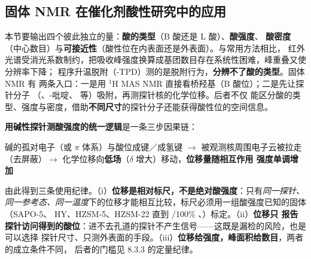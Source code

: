 
\subsection{固体 NMR 在催化剂酸性研究中的应用}
\label{sec:acidity}

\begin{probout}
本节要输出四个彼此独立的量：\textbf{酸的类型}（B 酸还是 L 酸）、\textbf{酸强度}、
\textbf{酸密度}（中心数目）与\textbf{可接近性}（酸性位在内表面还是外表面）。与常用方法相比，
红外光谱受消光系数制约，把吸收峰强度换算成基团数目存在系统性困难，峰重叠又使分辨率下降；
 程序升温脱附（-TPD）测的是脱附行为，\textbf{分辨不了酸的类型}。固体 NMR 有
两条入口：一是用 $^{1}$H MAS NMR 直接看桥羟基（B 酸位）；二是先让探针分子
（、-吡啶、 等）吸附，再测探针核的化学位移。后者不仅
能区分酸的类型、强度与密度，借助\textbf{不同尺寸}的探针分子还能获得酸性位的空间信息。
\end{probout}

\begin{principle}
\textbf{用碱性探针测酸强度的统一逻辑}是一条三步因果链：

\begin{center}
\fontsize{9}{13}\selectfont
碱的孤对电子（或 $\pi$ 体系）与酸位成键／成氢键 $\rightarrow$ 被观测核周围电子云被拉走
（去屏蔽）$\rightarrow$ 化学位移向\textbf{低场}（$\delta$ 增大）移动，\textbf{位移量随相互作用
强度单调增加}
\end{center}

由此得到三条使用纪律。（i）\textbf{位移是相对标尺，不是绝对酸强度}：只有\emph{同一探针、
同一参考态、同一温度}下的位移才能相互比较，标尺必须用一组酸强度已知的固体（SAPO-5、
HY、HZSM-5、HZSM-22 直到 /100\% 、）标定。（ii）\textbf{位移只
报告探针访问得到的酸位}：进不去孔道的探针不产生信号——这既是漏检的风险，也是可以选择
探针尺寸、只测外表面的手段。（iii）\textbf{位移给强度，峰面积给数目}，两者的成立条件不同，
后者的门槛见 8.3.3 的定量纪律。
\end{principle}

